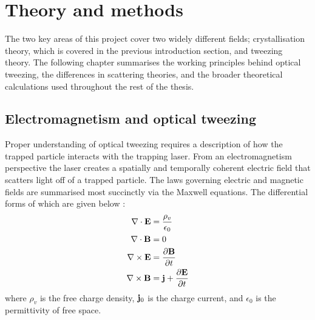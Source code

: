 \chapter{Theory and methods}
\label{chapter:theory}
The two key areas of this project cover two widely different
fields; crystallisation theory, which is covered in the 
previous introduction section, and tweezing theory. The 
following chapter summarises the working principles behind 
optical tweezing, the differences in scattering theories, 
and the broader theoretical calculations used throughout the 
rest of the thesis.

\section{Electromagnetism and optical tweezing}

Proper understanding of optical tweezing requires a description
of how the trapped particle interacts with the trapping laser. 
From an electromagnetism perspective the laser creates a 
spatially and temporally coherent electric field that scatters 
light off of a trapped particle. The laws governing electric 
and magnetic fields are summarised most succinctly via the 
Maxwell equations. The differential forms of which are given 
below \cite{Jackson_1975}:
\begin{align}
  \nabla \cdot \mathbf{E}
  &= \frac{\rho_ v}{\epsilon_0}
  \\
  \nabla \cdot \mathbf{B}
  &= 0
  \\
  \nabla \times \mathbf{E}
  &= \frac{\partial \mathbf{B}}{\partial t}
  \\
  \nabla \times \mathbf{B}
  &= {\bf j} +\frac{\partial \mathbf{E}}{\partial t}    
\end{align}
where $\rho_v$ is the free charge density, ${\bf j}_0$ is the 
charge current, and $\epsilon_0$ is the permittivity of free 
space. 

